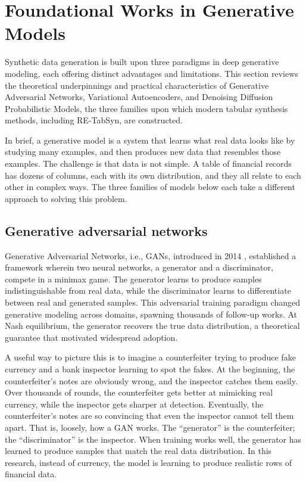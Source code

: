 \section{Foundational Works in Generative Models}

Synthetic data generation is built upon three paradigms in deep generative modeling, each offering distinct advantages and limitations. This section reviews the theoretical underpinnings and practical characteristics of Generative Adversarial Networks, Variational Autoencoders, and Denoising Diffusion Probabilistic Models, the three families upon which modern tabular synthesis methods, including RE-TabSyn, are constructed.

In brief, a generative model is a system that learns what real data looks like by studying many examples, and then produces new data that resembles those examples. The challenge is that data is not simple. A table of financial records has dozens of columns, each with its own distribution, and they all relate to each other in complex ways. The three families of models below each take a different approach to solving this problem.

\subsection{Generative adversarial networks}

Generative Adversarial Networks, i.e., GANs, introduced in 2014 \cite{goodfellow2014gan}, established a framework wherein two neural networks, a generator and a discriminator, compete in a minimax game. The generator learns to produce samples indistinguishable from real data, while the discriminator learns to differentiate between real and generated samples. This adversarial training paradigm changed generative modeling across domains, spawning thousands of follow-up works. At Nash equilibrium, the generator recovers the true data distribution, a theoretical guarantee that motivated widespread adoption.

A useful way to picture this is to imagine a counterfeiter trying to produce fake currency and a bank inspector learning to spot the fakes. At the beginning, the counterfeiter's notes are obviously wrong, and the inspector catches them easily. Over thousands of rounds, the counterfeiter gets better at mimicking real currency, while the inspector gets sharper at detection. Eventually, the counterfeiter's notes are so convincing that even the inspector cannot tell them apart. That is, loosely, how a GAN works. The ``generator'' is the counterfeiter; the ``discriminator'' is the inspector. When training works well, the generator has learned to produce samples that match the real data distribution. In this research, instead of currency, the model is learning to produce realistic rows of financial data.

